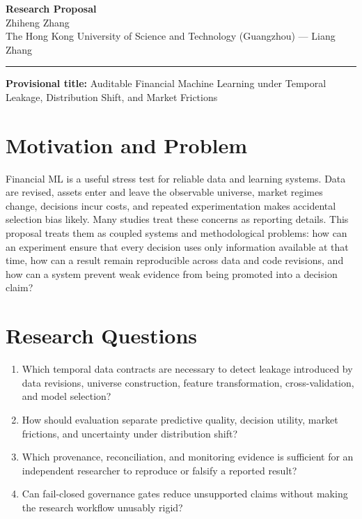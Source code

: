 \documentclass[11pt]{article}
\newcommand{\ApplicantName}{Zhiheng Zhang}
\begin{document}
\begin{center}
{\LARGE\bfseries Research Proposal}\\[0.25em]
{\large \ApplicantName}\\
The Hong Kong University of Science and Technology (Guangzhou) --- Liang Zhang
\end{center}
\vspace{0.35em}\hrule\vspace{0.65em}

\setlength{\parskip}{0.45em}
\textbf{Provisional title:} Auditable Financial Machine Learning under Temporal Leakage, Distribution Shift, and Market Frictions

\section*{Motivation and Problem}
Financial ML is a useful stress test for reliable data and learning systems. Data are revised, assets enter and leave the observable universe, market regimes change, decisions incur costs, and repeated experimentation makes accidental selection bias likely. Many studies treat these concerns as reporting details. This proposal treats them as coupled systems and methodological problems: how can an experiment ensure that every decision uses only information available at that time, how can a result remain reproducible across data and code revisions, and how can a system prevent weak evidence from being promoted into a decision claim?

\section*{Research Questions}
\begin{enumerate}
\item Which temporal data contracts are necessary to detect leakage introduced by data revisions, universe construction, feature transformation, cross-validation, and model selection?
\item How should evaluation separate predictive quality, decision utility, market frictions, and uncertainty under distribution shift?
\item Which provenance, reconciliation, and monitoring evidence is sufficient for an independent researcher to reproduce or falsify a reported result?
\item Can fail-closed governance gates reduce unsupported claims without making the research workflow unusably rigid?
\end{enumerate}
\end{document}
